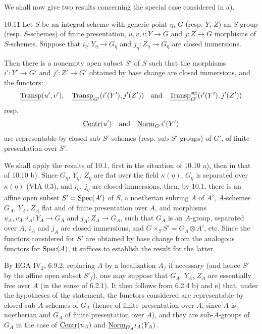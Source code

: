 We shall now give two results concerning the special case considered in a).

\begin{proposition}{10.11}\label{VIB.10.11}
Let $S$ be an integral scheme with generic point $\eta$, $G$ (resp. $Y$, $Z$) an $S$-group (resp. $S$-schemes) of finite presentation, $u,v,i:Y\to G$ and $j:Z\to G$ morphisms of $S$-schemes. Suppose that $i_\eta:Y_\eta\to G_\eta$ and $j_\eta:Z_\eta\to G_\eta$ are closed immersions.

Then there is a nonempty open subset $S'$ of $S$ such that the morphisms $i':Y'\to G'$ and $j':Z'\to G'$ obtained by base change are closed immersions, and the functors:
\[
\underline{\operatorname{Transp}}(u',v'),\quad\underline{\operatorname{Transp}}_{G'}(i'(Y'),j'(Z'))\quad\text{and}\quad\underline{\operatorname{Transp}}^{\mathrm{str}}_{G'}(i'(Y'),j'(Z'))
\]
resp.
\[
\underline{\mathrm{Centr}}(u')\quad\text{and}\quad\underline{\mathrm{Norm}}_{G'}i'(Y')
\]
are representable by closed sub-$S'$-schemes (resp. sub-$S'$-groups) of $G'$, of finite presentation over $S'$.
\end{proposition}
We shall apply the results of 10.1, first in the situation of 10.10 a), then in that of 10.10 b). Since $G_\eta$, $Y_\eta$, $Z_\eta$ are flat over the field $\kappa(\eta)$, $G_\eta$ is separated over $\kappa(\eta)$ (VIA 0.3), and $i_\eta$, $j_\eta$ are closed immersions, then, by 10.1, there is an affine open subset $S'=\operatorname{Spec}(A')$ of $S$, a noetherian subring $A$ of $A'$, $A$-schemes $G_A$, $Y_A$, $Z_A$ flat and of finite presentation over $A$, and morphisms $u_A,v_A,i_A:Y_A\to G_A$ and $j_A:Z_A\to G_A$, such that $G_A$ is an $A$-group, separated over $A$, $i_A$ and $j_A$ are closed immersions, and $G\times_S S'=G_A\otimes A'$, etc. Since the functors considered for $S'$ are obtained by base change from the analogous functors for $\operatorname{Spec}(A)$, it suffices to establish the result for the latter.

By EGA IV$_2$, 6.9.2, replacing $A$ by a localization $A_f$ if necessary (and hence $S'$ by the affine open subset $S'_f$), one may suppose that $G_A$, $Y_A$, $Z_A$ are essentially free over $A$ (in the sense of 6.2.1). It then follows from 6.2.4 b) and e) that, under the hypotheses of the statement, the functors considered are representable by closed sub-$A$-schemes of $G_A$ (hence of finite presentation over $A$, since $A$ is noetherian and $G_A$ of finite presentation over $A$), and they are sub-$A$-groups of $G_A$ in the case of $\underline{\mathrm{Centr}}(u_A)$ and $\underline{\mathrm{Norm}}_{G_A}i_A(Y_A)$.
